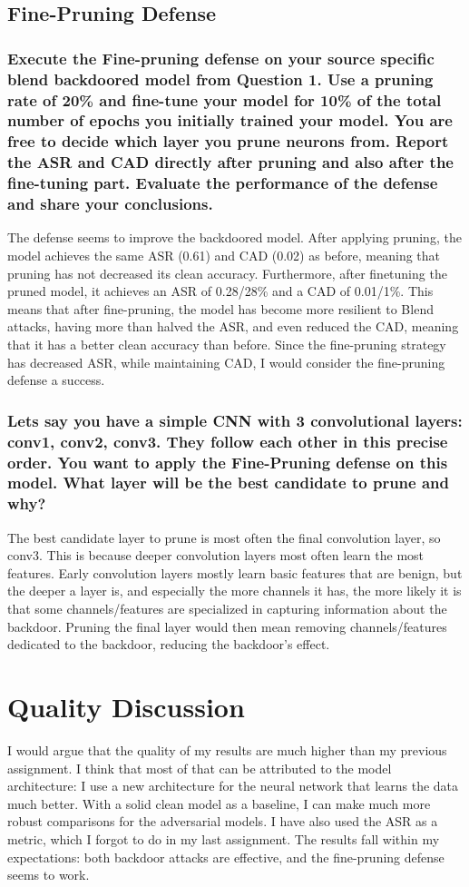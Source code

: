 \documentclass{article}
\begin{document}
\subsection{Fine-Pruning Defense}
\subsubsection{Execute the Fine-pruning defense on your source specific blend backdoored model from Question 1. Use a pruning rate of 20\% and fine-tune your
model for 10\% of the total number of epochs you initially trained your model.
You are free to decide which layer you prune neurons from. Report the ASR
and CAD directly after pruning and also after the fine-tuning part. Evaluate
the performance of the defense and share your conclusions.}
The defense seems to improve the backdoored model. 
After applying pruning, the model achieves the same ASR (0.61) and CAD (0.02) as before, meaning that pruning has not decreased its clean accuracy. 
Furthermore, after finetuning the pruned model, it achieves an ASR of 0.28/28\% and a CAD of 0.01/1\%. 
This means that after fine-pruning, the model has become more resilient to Blend attacks, having more than halved the ASR, and even reduced the CAD, meaning that it has a better clean accuracy than before. 
Since the fine-pruning strategy has decreased ASR, while maintaining CAD, I would consider the fine-pruning defense a success.

\subsubsection{Lets say you have a simple CNN with 3 convolutional layers: conv1,
conv2, conv3. They follow each other in this precise order. You want to apply
the Fine-Pruning defense on this model. What layer will be the best candidate
to prune and why?}
The best candidate layer to prune is most often the final convolution layer, so conv3. 
This is because deeper convolution layers most often learn the most features. 
Early convolution layers mostly learn basic features that are benign, but the deeper a layer is, and especially the more channels it has, the more likely it is that some channels/features are specialized in capturing information about the backdoor. 
Pruning the final layer would then mean removing channels/features dedicated to the backdoor, reducing the backdoor's effect.

\section{Quality Discussion}
I would argue that the quality of my results are much higher than my previous assignment.
I think that most of that can be attributed to the model architecture: I use a new architecture for the neural network that learns the data much better.
With a solid clean model as a baseline, I can make much more robust comparisons for the adversarial models.
I have also used the ASR as a metric, which I forgot to do in my last assignment.
The results fall within my expectations: both backdoor attacks are effective, and the fine-pruning defense seems to work.
\end{document}
